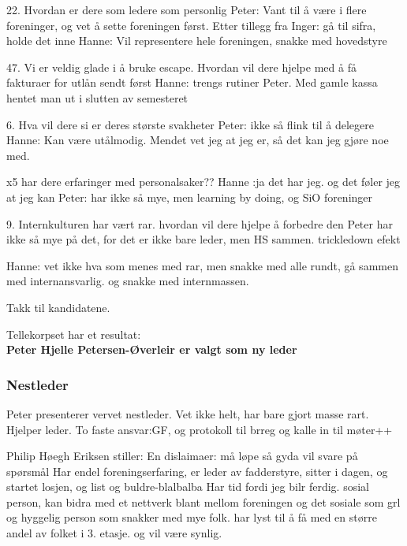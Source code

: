 \documentclass[10pt,norsk,a4paper,usenames,dvipsnames]{article}
\begin{document}
        22. Hvordan er dere som ledere som personlig
        Peter: Vant til å være i flere foreninger, og vet å sette foreningen først. Etter tillegg fra Inger: gå til sifra, holde det inne
        Hanne: Vil representere hele foreningen, snakke med hovedstyre
        
        47. Vi er veldig glade i å bruke escape. Hvordan vil dere hjelpe med å få fakturaer for utlån sendt først
        Hanne: trengs rutiner
        Peter. Med gamle kassa hentet man ut i slutten av semesteret
        
        6. Hva vil dere si er deres største svakheter
        Peter: ikke så flink til å delegere
        Hanne: Kan være utålmodig. Mendet vet jeg at jeg er, så det kan jeg gjøre noe med.
        
        x5 har dere erfaringer med personalsaker??
        Hanne :ja det har jeg. og det føler jeg at jeg kan
        Peter: har ikke så mye, men learning by doing, og SiO foreninger
        
        9. Internkulturen har vært rar. hvordan vil dere hjelpe å forbedre den
        Peter har ikke så mye på det, for det er ikke bare leder, men HS sammen. trickledown efekt
        
        Hanne: vet ikke hva som menes med rar, men snakke med alle rundt, gå sammen med internansvarlig. og snakke med internmassen.
        
        Takk til kandidatene.
        
        Tellekorpset har et resultat:\\
        \textbf{Peter Hjelle Petersen-Øverleir er valgt som ny leder}
        
        \subsubsection{Nestleder}
        Peter presenterer vervet nestleder.
        Vet ikke helt, har bare gjort masse rart. Hjelper leder.
        To faste ansvar:GF, og protokoll til brreg og kalle in til møter++
        
        Philip Høegh Eriksen stiller:
        En dislaimaer: må løpe så gyda vil svare på spørsmål
        Har endel foreningserfaring, er leder av fadderstyre, sitter i dagen, og startet losjen, og list og buldre-blalbalba
        Har tid fordi jeg bilr ferdig. sosial person, kan bidra med et nettverk blant mellom foreningen og det sosiale som grl og hyggelig person som snakker med mye folk.
        har lyst til å få med en større andel av folket i 3. etasje. og vil være synlig.
        
\end{document}
